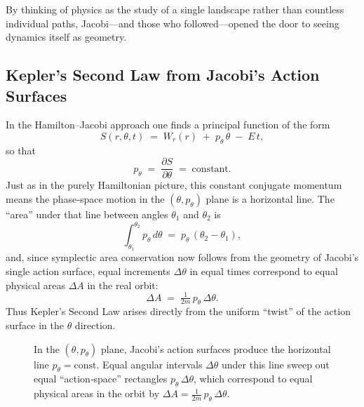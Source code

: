 By thinking of physics as the study of a single landscape rather than countless individual paths, Jacobi—and those who followed—opened the door to seeing dynamics itself as geometry.  




\subsection{Kepler’s Second Law from Jacobi’s Action Surfaces}

In the Hamilton–Jacobi approach one finds a principal function of the form
\[
S(r,\theta,t) \;=\; W_r(r)\;+\;p_\theta\,\theta \;-\;E\,t,
\]
so that
\[
p_\theta \;=\;\frac{\partial S}{\partial \theta}
\;=\;\text{constant}.
\]
Just as in the purely Hamiltonian picture, this constant conjugate momentum means the phase‐space motion in the \((\theta,p_\theta)\) plane is a horizontal line.  The “area” under that line between angles \(\theta_1\) and \(\theta_2\) is
\[
\int_{\theta_1}^{\theta_2} p_\theta\,d\theta
\;=\;
p_\theta\,(\theta_2-\theta_1),
\]
and, since symplectic area conservation now follows from the geometry of Jacobi’s single action surface, equal increments \(\Delta\theta\) in equal times correspond to equal physical areas \(\Delta A\) in the real orbit:
\[
\Delta A \;=\;\tfrac{1}{2m}\,p_\theta\,\Delta\theta.
\]
Thus Kepler’s Second Law arises directly from the uniform “twist” of the action surface in the \(\theta\) direction.

\begin{figure}[H]
\centering
{}
\caption{In the \((\theta,p_\theta)\) plane, Jacobi’s action surfaces produce the horizontal line \(p_\theta=\mathrm{const}\).  Equal angular intervals \(\Delta\theta\) under this line sweep out equal “action‐space” rectangles \(p_\theta\,\Delta\theta\), which correspond to equal physical areas in the orbit by \(\Delta A = \tfrac{1}{2m}\,p_\theta\,\Delta\theta\).}
\end{figure}

